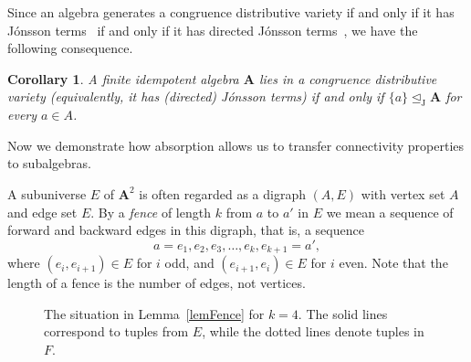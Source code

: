 \documentclass{amsart}
\theoremstyle{plain}
\newtheorem{corollary}[theorem]{Corollary}
\theoremstyle{definition}
\begin{document}
Since an algebra generates a congruence distributive variety if and only if it has J\'onsson terms~\cite{jonsson} if and only if it has
directed J\'onsson terms~\cite{directed-jonsson}, we have the following consequence.
\begin{corollary} \label{cor-Jonsson}
  A finite idempotent algebra ${{\mathbf{A}}}$ lies in a congruence distributive variety (equivalently, it has (directed) J\'onsson terms)  if and only if 
$\{a\}\operatorname{\trianglelefteq_J} {{\mathbf{A}}}$ for every $a\in A$.
\end{corollary}
Now we demonstrate how absorption allows us to transfer
connectivity properties to subalgebras. 

A subuniverse $E$ of ${{\mathbf{A}}}^2$ is often regarded as a digraph $(A,E)$ with vertex set $A$ and edge set $E$. 
By a \emph{fence} of length $k$ from $a$ to $a'$ in $E$
we mean a sequence of forward and backward edges in this digraph, that is,
a sequence \[ a=e_1,e_2,e_3,\dots,e_{k},e_{k+1}=a', \]  where $(e_i,e_{i+1})\in
E$ for $i$ odd, and $(e_{i+1},e_i)\in E$ for $i$ even. Note that the length of
a fence is the number of edges, not vertices.

\begin{figure}
  \begin{center}
  \end{center}
  \caption{The situation in Lemma~\ref{lemFence} for $k=4$. The solid lines correspond to tuples
  from $E$, while the dotted lines denote tuples in $F$.}
  \label{figCDpath}
\end{figure}
\end{document}
